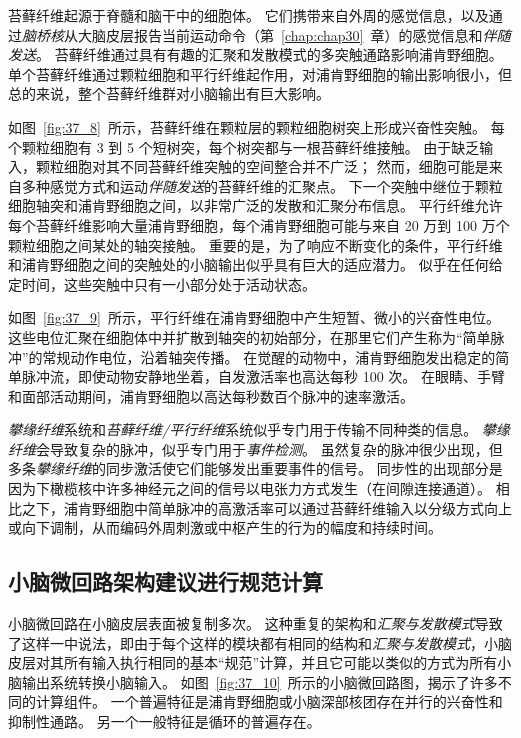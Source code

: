 苔藓纤维起源于脊髓和脑干中的细胞体。
它们携带来自外周的感觉信息，以及通过\textit{脑桥核}从大脑皮层报告当前运动命令（第~\ref{chap:chap30}~章）的感觉信息和\textit{伴随发送}。
苔藓纤维通过具有有趣的汇聚和发散模式的多突触通路影响浦肯野细胞。
单个苔藓纤维通过颗粒细胞和平行纤维起作用，对浦肯野细胞的输出影响很小，但总的来说，整个苔藓纤维群对小脑输出有巨大影响。


如图~\ref{fig:37_8}~所示，苔藓纤维在颗粒层的颗粒细胞树突上形成兴奋性突触。
每个颗粒细胞有 3 到 5 个短树突，每个树突都与一根苔藓纤维接触。
由于缺乏输入，颗粒细胞对其不同苔藓纤维突触的空间整合并不广泛；
然而，细胞可能是来自多种感觉方式和运动\textit{伴随发送}的苔藓纤维的汇聚点。
下一个突触中继位于颗粒细胞轴突和浦肯野细胞之间，以非常广泛的发散和汇聚分布信息。
平行纤维允许每个苔藓纤维影响大量浦肯野细胞，每个浦肯野细胞可能与来自 20 万到 100 万个颗粒细胞之间某处的轴突接触。
重要的是，为了响应不断变化的条件，平行纤维和浦肯野细胞之间的突触处的小脑输出似乎具有巨大的适应潜力。
似乎在任何给定时间，这些突触中只有一小部分处于活动状态。


如图~\ref{fig:37_9}~所示，平行纤维在浦肯野细胞中产生短暂、微小的兴奋性电位。
这些电位汇聚在细胞体中并扩散到轴突的初始部分，在那里它们产生称为“简单脉冲”的常规动作电位，沿着轴突传播。
在觉醒的动物中，浦肯野细胞发出稳定的简单脉冲流，即使动物安静地坐着，自发激活率也高达每秒 100 次。
在眼睛、手臂和面部活动期间，浦肯野细胞以高达每秒数百个脉冲的速率激活。


\textit{攀缘纤维}系统和\textit{苔藓纤维/平行纤维}系统似乎专门用于传输不同种类的信息。
\textit{攀缘纤维}会导致复杂的脉冲，似乎专门用于\textit{事件检测}。
虽然复杂的脉冲很少出现，但多条\textit{攀缘纤维}的同步激活使它们能够发出重要事件的信号。
同步性的出现部分是因为下橄榄核中许多神经元之间的信号以电张力方式发生（在间隙连接通道）。
相比之下，浦肯野细胞中简单脉冲的高激活率可以通过苔藓纤维输入以分级方式向上或向下调制，从而编码外周刺激或中枢产生的行为的幅度和持续时间。


\subsection{小脑微回路架构建议进行规范计算}

小脑微回路在小脑皮层表面被复制多次。
这种重复的架构和\textit{汇聚与发散模式}导致了这样一中说法，即由于每个这样的模块都有相同的结构和\textit{汇聚与发散模式}，小脑皮层对其所有输入执行相同的基本“规范”计算，并且它可能以类似的方式为所有小脑输出系统转换小脑输入。
如图~\ref{fig:37_10}~所示的小脑微回路图，揭示了许多不同的计算组件。
一个普遍特征是浦肯野细胞或小脑深部核团存在并行的兴奋性和抑制性通路。
另一个一般特征是循环的普遍存在。


